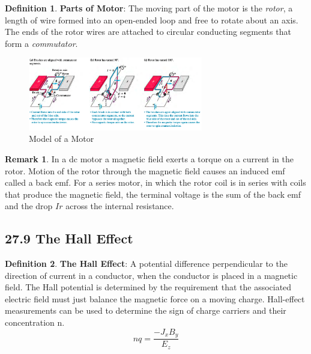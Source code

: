 \documentclass[12pt]{amsart}
\theoremstyle{definition}
\newtheorem{definition}{Definition} %
\newtheorem*{remark}{Remark}        %
\numberwithin{equation}{theorem}    %
\begin{document}
\begin{definition}
    \textbf{Parts of Motor}:
    The moving part of the motor is the \textit{rotor}, a length of wire formed into an open-ended loop and free to rotate about an axis. The ends of the rotor wires are attached to circular conducting segments that form a \textit{commutator}.
\end{definition}
\begin{figure}[H]
    \centering
    \includegraphics[width=3in]{Media/motor.png}
    \caption{Model of a Motor}
    \label{Model of a Motor}
\end{figure}
\begin{remark}
    In a dc motor a magnetic field exerts a torque on a current in the rotor. Motion of the rotor through the magnetic field causes an induced emf called a back emf. For a series motor, in which the rotor coil is in series with coils that produce the magnetic field, the terminal voltage is the sum of the back emf and the drop $Ir$ across the internal resistance.
\end{remark}

\subsection*{27.9 The Hall Effect}

\begin{definition}
    \textbf{The Hall Effect}:
    A potential difference perpendicular to the direction of current in a conductor, when the conductor is placed in a magnetic field. The Hall potential is determined by the requirement that the associated electric field must just balance the magnetic force on a moving charge. Hall-effect measurements can be used to determine the sign of charge carriers and their concentration n. 
    $$nq=\frac{-J_xB_y}{E_z}$$


\end{definition}
\end{document}
